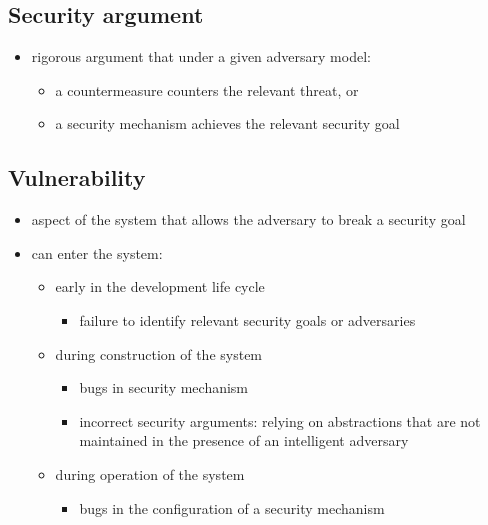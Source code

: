 \documentclass[12pt,titlepage,a4paper]{report}
\begin{document}
	\subsection{Security argument}
	\begin{itemize}
		\item rigorous argument that under a given adversary model:
		\begin{itemize}
			\item a countermeasure counters the relevant threat, or
			\item a security mechanism achieves the relevant security goal
		\end{itemize}
	\end{itemize}

	\subsection{Vulnerability}
	\begin{itemize}
		\item aspect of the system that allows the adversary to break a security goal
		\item can enter the system:
		\begin{itemize}
			\samepage
			\item early in the development life cycle
			\begin{itemize}
				\item failure to identify relevant security goals or adversaries
			\end{itemize}
			\item during construction of the system
			\begin{itemize}
				\item bugs in security mechanism
				\item incorrect security arguments: relying on abstractions that are not maintained in the presence of an intelligent adversary
			\end{itemize}
			\item during operation of the system
			\begin{itemize}
				\item bugs in the configuration of a security mechanism
			\end{itemize}
		\end{itemize}
	\end{itemize}
\end{document}
